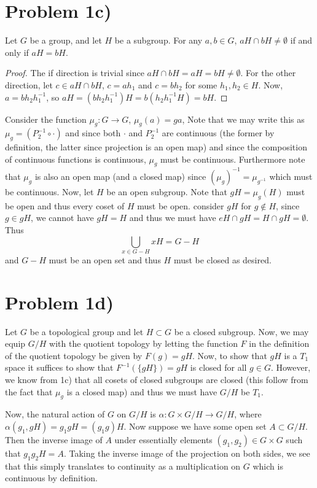 \section*{Problem 1c)}
\begin{lemma}
Let $G$ be a group, and let $H$ be a subgroup. For any $a,b\in G$, $aH\cap bH \neq \emptyset$ if and only if $aH=bH$. 
\begin{proof}
The if direction is trivial since $aH\cap bH = aH =bH \neq \emptyset$. For the other direction, let $c\in aH\cap bH$, $c = ah_1$ and $c=bh_2$ for some $h_1,h_2\in H$. Now, $a=bh_2h_1^{-1}$, so $aH = (bh_2h_1^{-1})H = b(h_2h_1^{-1}H) = bH$. 
\end{proof}
\end{lemma}
Consider the function $\mu_g: G\to G$, $\mu_g(a)=ga$, Note that we may write this as $\mu_g=(P_2^{-1} \circ \cdot)$ and since both $\cdot$ and $P_2^{-1}$ are continuous (the former by definition, the latter since projection is an open map) and since the composition of continuous functions is continuous, $\mu_g$ must be continuous. Furthermore note that $\mu_g$ is also an open map (and a closed map) since $(\mu_g)^{-1} = \mu_{g^{-1}}$ which must be continuous. Now, let $H$ be an open subgroup. Note that $gH=\mu_g(H)$ must be open and thus every coset of $H$ must be open.
consider $gH$ for $g\notin H$, since $g\in gH$, we cannot have $gH = H$ and thus we must have $eH\cap gH = H\cap gH = \emptyset$. Thus 
\[ \bigcup_{x\in G-H} xH = G-H \]
and $G-H$ must be an open set and thus $H$ must be closed as desired. 
\section*{Problem 1d)}
Let $G$ be a topological group and let $H\subset G$ be a closed subgroup. Now, we may equip $G/H$ with the quotient topology by letting the function $F$ in the definition of the quotient topology be given by $F(g) = gH$. Now, to show that $gH$ is a $T_1$ space it suffices to show that $F^{-1}(\{gH\})=gH$ is closed for all $g\in G$. However, we know from 1c) that all cosets of closed subgroups are closed (this follow from the fact that $\mu_g$ is a closed map) and thus we must have $G/H$ be $T_1$.\par
Now, the natural action of $G$ on $G/H$ is $\alpha: G\times G/H \to  G/H$, where $\alpha(g_1,gH) = g_1gH = (g_1g)H$. Now suppose we have some open set $A\subset G/H$. Then the inverse image of $A$ under essentially elements $(g_1,g_2)\in G\times G$ such that $g_1g_2H = A$. Taking the inverse image of the projection on both sides, we see that this simply translates to continuity as a multiplication on $G$ which is continuous by definition.
